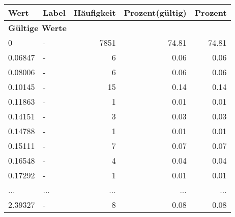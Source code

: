      \begin{longtable}{lXrrr}
     \toprule
     \textbf{Wert} & \textbf{Label} & \textbf{Häufigkeit} & \textbf{Prozent(gültig)} & \textbf{Prozent} \\
     \endhead
     \midrule
     \multicolumn{5}{l}{\textbf{Gültige Werte}}\\
        0 & \multicolumn{1}{X}{-} & %
          \num{7851} &
          \num[round-mode=places,round-precision=2]{74.81} &
          \num[round-mode=places,round-precision=2]{74.81} \\
        0.06847 & \multicolumn{1}{X}{-} & %
          \num{6} &
          \num[round-mode=places,round-precision=2]{0.06} &
          \num[round-mode=places,round-precision=2]{0.06} \\
        0.08006 & \multicolumn{1}{X}{-} & %
          \num{6} &
          \num[round-mode=places,round-precision=2]{0.06} &
          \num[round-mode=places,round-precision=2]{0.06} \\
        0.10145 & \multicolumn{1}{X}{-} & %
          \num{15} &
          \num[round-mode=places,round-precision=2]{0.14} &
          \num[round-mode=places,round-precision=2]{0.14} \\
        0.11863 & \multicolumn{1}{X}{-} & %
          \num{1} &
          \num[round-mode=places,round-precision=2]{0.01} &
          \num[round-mode=places,round-precision=2]{0.01} \\
        0.14151 & \multicolumn{1}{X}{-} & %
          \num{3} &
          \num[round-mode=places,round-precision=2]{0.03} &
          \num[round-mode=places,round-precision=2]{0.03} \\
        0.14788 & \multicolumn{1}{X}{-} & %
          \num{1} &
          \num[round-mode=places,round-precision=2]{0.01} &
          \num[round-mode=places,round-precision=2]{0.01} \\
        0.15111 & \multicolumn{1}{X}{-} & %
          \num{7} &
          \num[round-mode=places,round-precision=2]{0.07} &
          \num[round-mode=places,round-precision=2]{0.07} \\
        0.16548 & \multicolumn{1}{X}{-} & %
          \num{4} &
          \num[round-mode=places,round-precision=2]{0.04} &
          \num[round-mode=places,round-precision=2]{0.04} \\
        0.17292 & \multicolumn{1}{X}{-} & %
          \num{1} &
          \num[round-mode=places,round-precision=2]{0.01} &
          \num[round-mode=places,round-precision=2]{0.01} \\
       ... & ... & ... & ... & ... \\
        2.39327 & \multicolumn{1}{X}{-} & %
          \num{8} &
          \num[round-mode=places,round-precision=2]{0.08} &
          \num[round-mode=places,round-precision=2]{0.08} \\


\end{longtable}

